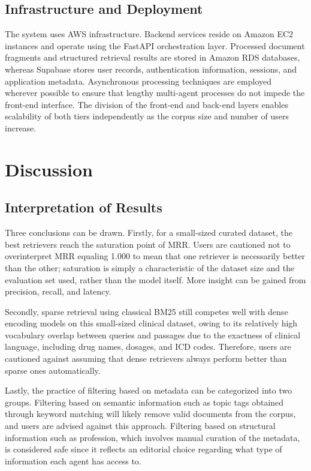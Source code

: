 \documentclass[pdflatex,sn-mathphys-num]{sn-jnl}
\theoremstyle{thmstyleone}
\theoremstyle{thmstyletwo}
\theoremstyle{thmstylethree}
\begin{document}
\subsection{Infrastructure and Deployment}

The system uses AWS infrastructure. Backend services reside on Amazon EC2 instances and operate using the FastAPI orchestration layer. Processed document fragments and structured retrieval results are stored in Amazon RDS databases, whereas Supabase stores user records, authentication information, sessions, and application metadata. Asynchronous processing techniques are employed wherever possible to ensure that lengthy multi-agent processes do not impede the front-end interface. The division of the front-end and back-end layers enables scalability of both tiers independently as the corpus size and number of users increase.

\section{Discussion}\label{sec:discussion}

\subsection{Interpretation of Results}

Three conclusions can be drawn. Firstly, for a small-sized curated dataset, the best retrievers reach the saturation point of MRR. Users are cautioned not to overinterpret MRR equaling 1.000 to mean that one retriever is necessarily better than the other; saturation is simply a characteristic of the dataset size and the evaluation set used, rather than the model itself. More insight can be gained from precision, recall, and latency.

Secondly, sparse retrieval using classical BM25 still competes well with dense encoding models on this small-sized clinical dataset, owing to its relatively high vocabulary overlap between queries and passages due to the exactness of clinical language, including drug names, dosages, and ICD codes. Therefore, users are cautioned against assuming that dense retrievers always perform better than sparse ones automatically.

Lastly, the practice of filtering based on metadata can be categorized into two groups. Filtering based on semantic information such as topic tags obtained through keyword matching will likely remove valid documents from the corpus, and users are advised against this approach. Filtering based on structural information such as profession, which involves manual curation of the metadata, is considered safe since it reflects an editorial choice regarding what type of information each agent has access to.
\end{document}
